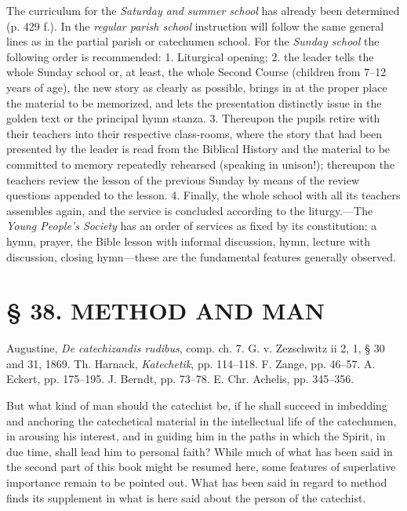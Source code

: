 The curriculum for the \emph{Saturday and summer school} has already been determined (p. 429 f.). In the \emph{regular parish school} instruction will follow the same general lines as in the partial parish or catechumen school. For the \emph{Sunday school} the following order is recommended: 1. Liturgical opening; 2. the leader tells the whole Sunday school or, at least, the whole Second Course (children from 7–12 years of age), the new story as clearly as possible, brings in at the proper place the material to be memorized, and lets the presentation distinctly issue in the golden text or the principal hymn stanza. 3. Thereupon the pupils retire with their teachers into their respective class-rooms, where the story that had been presented by the leader is read from the Biblical History and the material to be committed to memory repeatedly rehearsed (speaking in unison!); thereupon the teachers review the lesson of the previous Sunday by means of the review questions appended to the lesson. 4. Finally,
the whole school with all its teachers assembles again, and the service is concluded according to the liturgy.—The \emph{Young People’s Society} has an order of services as fixed by its constitution: a hymn, prayer, the Bible lesson with informal discussion, hymn, lecture with discussion, closing hymn—these are the fundamental features generally observed.

\chapter{§ 38. METHOD AND MAN}

Augustine, \emph{De catechizandis rudibus}, comp. ch. 7. G. v. Zezschwitz ii 2, 1, § 30 and 31, 1869. Th. Harnack, \emph{Katechetik}, pp. 114–118. F. Zange, pp. 46–57. A. Eckert, pp. 175–195. J. Berndt, pp. 73–78. E. Chr. Achelis, pp. 345–356.

But what kind of man should the catechist be, if he shall succeed in imbedding and anchoring the catechetical material in the intellectual life of the catechumen, in arousing his interest, and in guiding him in the paths in which the Spirit, in due time, shall lead him to personal faith? While much of what has been said in the second part of this book might be resumed here, some features of superlative importance remain to be pointed out. What has been said in regard to method finds its supplement in what is here said about the person of the catechist.

